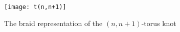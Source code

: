 \documentclass[main.tex]{subfiles}
\begin{document}
\begin{figure}
\centering
\texttt{[image: t(n,n+1)]}
\caption{The braid representation of the $(n, n+ 1)$-torus knot}
\label{fig:torusnn+1}
\end{figure}
%
%
%
%
%
%
%
%
%
%
%
%
%
\end{document}
